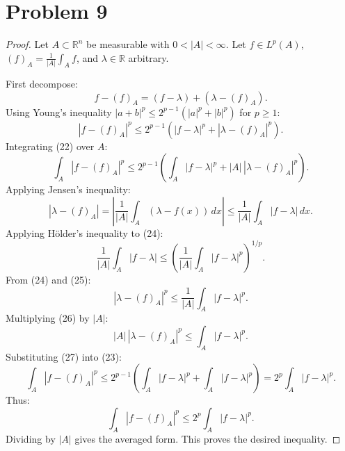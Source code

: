 \section{Problem 9}
\begin{proof}
Let $A\subset\mathbb{R}^n$ be measurable with $0<|A|<\infty$. Let $f\in L^p(A)$, $(f)_A=\frac{1}{|A|}\int_A f$, and $\lambda\in\mathbb{R}$ arbitrary.

First decompose:
\[
f-(f)_A = (f-\lambda)+(\lambda-(f)_A).
\tag{21}
\]
Using Young's inequality $|a+b|^p\le 2^{p-1}(|a|^p+|b|^p)$ for $p\ge 1$:
\[
|f-(f)_A|^p\le 2^{p-1}(|f-\lambda|^p+|\lambda-(f)_A|^p).
\tag{22}
\]
Integrating (22) over $A$:
\[
\int_A|f-(f)_A|^p \le 2^{p-1}\left(\int_A |f-\lambda|^p + |A|\,|\lambda-(f)_A|^p\right).
\tag{23}
\]
Applying Jensen's inequality:
\[
|\lambda-(f)_A|=\left|\frac{1}{|A|}\int_A(\lambda-f(x))\, dx\right|\le \frac{1}{|A|}\int_A |f-\lambda|\, dx.
\tag{24}
\]
Applying H\"older's inequality to (24):
\[
\frac{1}{|A|}\int_A |f-\lambda| \le\left(\frac{1}{|A|}\int_A|f-\lambda|^p\right)^{1/p}.
\tag{25}
\]
From (24) and (25):
\[
|\lambda-(f)_A|^p \le \frac{1}{|A|}\int_A|f-\lambda|^p.
\tag{26}
\]
Multiplying (26) by $|A|$:
\[
|A|\,|\lambda-(f)_A|^p \le \int_A|f-\lambda|^p.
\tag{27}
\]
Substituting (27) into (23):
\[
\int_A|f-(f)_A|^p\le 2^{p-1}\left(\int_A |f-\lambda|^p+\int_A|f-\lambda|^p\right)
=2^p\int_A |f-\lambda|^p.
\]
Thus:
\[
\boxed{
\int_A|f-(f)_A|^p\le 2^p\int_A |f-\lambda|^p.
}
\]
Dividing by $|A|$ gives the averaged form. This proves the desired inequality.
\end{proof}


